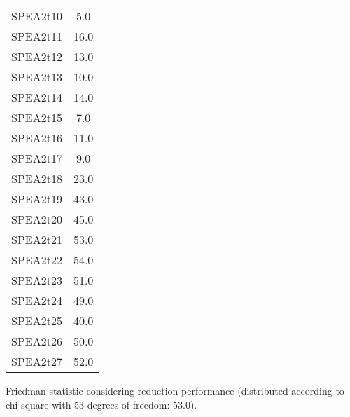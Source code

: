 \documentclass{article}
\begin{document}
\begin{table}[!htp]
\begin{tabular}{c|c}
SPEA2t10&5.0\\
SPEA2t11&16.0\\
SPEA2t12&13.0\\
SPEA2t13&10.0\\
SPEA2t14&14.0\\
SPEA2t15&7.0\\
SPEA2t16&11.0\\
SPEA2t17&9.0\\
SPEA2t18&23.0\\
SPEA2t19&43.0\\
SPEA2t20&45.0\\
SPEA2t21&53.0\\
SPEA2t22&54.0\\
SPEA2t23&51.0\\
SPEA2t24&49.0\\
SPEA2t25&40.0\\
SPEA2t26&50.0\\
SPEA2t27&52.0\\
\end{tabular}
\end{table}


Friedman statistic considering reduction performance (distributed according to chi-square with 53 degrees of freedom: 53.0).
\end{document}
